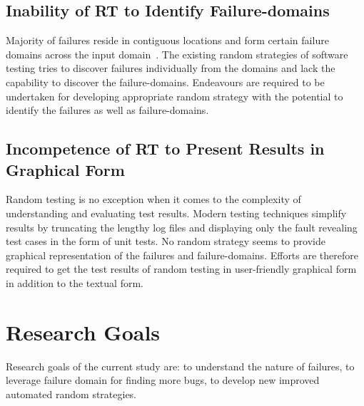 \subsection{Inability of RT to Identify Failure-domains}
Majority of failures reside in contiguous locations and form certain failure domains across the input domain~\cite{chan1996proportional}. The existing random strategies of software testing tries to discover failures individually from the domains and lack the capability to discover the failure-domains. Endeavours are required to be undertaken for developing appropriate random strategy with the potential to identify the failures as well as failure-domains. 


\subsection{Incompetence of RT to Present Results in Graphical Form}
Random testing is no exception when it comes to the complexity of understanding and evaluating test results. Modern testing techniques simplify results by truncating the lengthy log files and displaying only the fault revealing test cases in the form of unit tests. No random strategy seems to provide graphical representation of the failures and failure-domains. Efforts are therefore required to get the test results of random testing in user-friendly graphical form in addition to the textual form. 






\section{Research Goals}\label{ResearchGoals_1}
Research goals of the current study are: to understand the nature of failures, to leverage failure domain for finding more bugs, to develop new improved automated random strategies.

